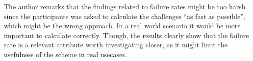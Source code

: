 

\begin{remark}
    The author remarks that the findings related to failure rates might be too harsh since the participants was asked to calculate the challenges ``as fast as possible'', which might be the wrong approach. In a real world scenario it would be more important to calculate correctly. Though, the results clearly show that the failure rate is a relevant attribute worth investigating closer, as it might limit the usefulness of the scheme in real usecases.
\end{remark}



